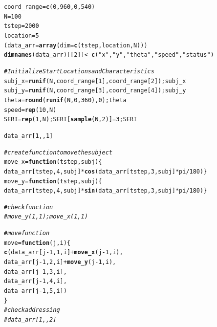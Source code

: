 \documentclass{article}\usepackage[]{graphicx}\usepackage[]{color}
\makeatletter
\newcommand{\hlnum}[1]{\textcolor[rgb]{0.686,0.059,0.569}{#1}}%
\newcommand{\hlstr}[1]{\textcolor[rgb]{0.192,0.494,0.8}{#1}}%
\newcommand{\hlcom}[1]{\textcolor[rgb]{0.678,0.584,0.686}{\textit{#1}}}%
\newcommand{\hlopt}[1]{\textcolor[rgb]{0,0,0}{#1}}%
\newcommand{\hlstd}[1]{\textcolor[rgb]{0.345,0.345,0.345}{#1}}%
\newcommand{\hlkwa}[1]{\textcolor[rgb]{0.161,0.373,0.58}{\textbf{#1}}}%
\newcommand{\hlkwb}[1]{\textcolor[rgb]{0.69,0.353,0.396}{#1}}%
\newcommand{\hlkwc}[1]{\textcolor[rgb]{0.333,0.667,0.333}{#1}}%
\newcommand{\hlkwd}[1]{\textcolor[rgb]{0.737,0.353,0.396}{\textbf{#1}}}%
\newenvironment{kframe}{%
 \def\at@end@of@kframe{}%
 \ifinner\ifhmode%
  \def\at@end@of@kframe{\end{minipage}}%
  \begin{minipage}{\columnwidth}%
 \fi\fi%
 \def\FrameCommand##1{\hskip\@totalleftmargin \hskip-\fboxsep
 \colorbox{shadecolor}{##1}\hskip-\fboxsep
     \hskip-\linewidth \hskip-\@totalleftmargin \hskip\columnwidth}%
 \MakeFramed {\advance\hsize-\width
   \@totalleftmargin\z@ \linewidth\hsize
   \@setminipage}}%
 {\par\unskip\endMakeFramed%
 \at@end@of@kframe}
\newenvironment{knitrout}{}{} %
\makeatother
\begin{document}
\begin{knitrout}
\color{fgcolor}\begin{kframe}
\begin{alltt}
\hlstd{coord_range} \hlkwb{=} \hlkwd{c}\hlstd{(}\hlnum{0}\hlstd{,} \hlnum{960}\hlstd{,} \hlnum{0}\hlstd{,} \hlnum{540}\hlstd{)}
\hlstd{N} \hlkwb{=} \hlnum{100}
\hlstd{tstep} \hlkwb{=} \hlnum{2000}
\hlstd{location} \hlkwb{=} \hlnum{5}
\hlstd{(data_arr} \hlkwb{=} \hlkwd{array}\hlstd{(}\hlkwc{dim}\hlstd{=}\hlkwd{c}\hlstd{(tstep,location, N)))}
\hlkwd{dimnames}\hlstd{(data_arr)[[}\hlnum{2}\hlstd{]]} \hlkwb{<-} \hlkwd{c}\hlstd{(}\hlstr{"x"}\hlstd{,} \hlstr{"y"}\hlstd{,} \hlstr{"theta"}\hlstd{,} \hlstr{"speed"}\hlstd{,} \hlstr{"status"}\hlstd{)}

\hlcom{# Initialize Start Locations and Characteristics}
\hlstd{subj_x} \hlkwb{=} \hlkwd{runif}\hlstd{(N, coord_range[}\hlnum{1}\hlstd{],  coord_range[}\hlnum{2}\hlstd{]); subj_x}
\hlstd{subj_y} \hlkwb{=} \hlkwd{runif}\hlstd{(N, coord_range[}\hlnum{3}\hlstd{],  coord_range[}\hlnum{4}\hlstd{]); subj_y}
\hlstd{theta} \hlkwb{=} \hlkwd{round}\hlstd{(}\hlkwd{runif}\hlstd{(N,} \hlnum{0}\hlstd{,} \hlnum{360}\hlstd{),}\hlnum{0}\hlstd{); theta}
\hlstd{speed} \hlkwb{=} \hlkwd{rep}\hlstd{(}\hlnum{10}\hlstd{,N)}
\hlstd{SERI} \hlkwb{=} \hlkwd{rep}\hlstd{(}\hlnum{1}\hlstd{, N); SERI[}\hlkwd{sample}\hlstd{(N,} \hlnum{2}\hlstd{)]} \hlkwb{=} \hlnum{3}\hlstd{; SERI}

\hlstd{data_arr[}\hlnum{1}\hlstd{,,}\hlnum{1}\hlstd{]}

\hlcom{#create function to move the subject}
\hlstd{move_x} \hlkwb{=} \hlkwa{function}\hlstd{(}\hlkwc{tstep}\hlstd{,} \hlkwc{subj}\hlstd{)\{}
\hlstd{data_arr[tstep,} \hlnum{4}\hlstd{, subj]} \hlopt{*} \hlkwd{cos}\hlstd{(data_arr[tstep,}\hlnum{3}\hlstd{, subj]}\hlopt{*}\hlstd{pi}\hlopt{/}\hlnum{180}\hlstd{)\}}
\hlstd{move_y} \hlkwb{=} \hlkwa{function}\hlstd{(}\hlkwc{tstep}\hlstd{,} \hlkwc{subj}\hlstd{)\{}
\hlstd{data_arr[tstep,} \hlnum{4}\hlstd{, subj]} \hlopt{*} \hlkwd{sin}\hlstd{(data_arr[tstep,}\hlnum{3}\hlstd{, subj]}\hlopt{*}\hlstd{pi}\hlopt{/}\hlnum{180}\hlstd{)\}}

\hlcom{# check function }
\hlcom{# move_y(1, 1); move_x(1,1)}

\hlcom{# move function}
\hlstd{move} \hlkwb{=} \hlkwa{function}\hlstd{(}\hlkwc{j}\hlstd{,} \hlkwc{i}\hlstd{)\{}
  \hlkwd{c}\hlstd{(data_arr[j}\hlopt{-}\hlnum{1}\hlstd{,} \hlnum{1}\hlstd{, i]}\hlopt{+} \hlkwd{move_x}\hlstd{(j}\hlopt{-}\hlnum{1}\hlstd{,i),}
    \hlstd{data_arr[j}\hlopt{-}\hlnum{1}\hlstd{,} \hlnum{2}\hlstd{, i]}\hlopt{+} \hlkwd{move_y}\hlstd{(j}\hlopt{-}\hlnum{1}\hlstd{,i),}
    \hlstd{data_arr[j}\hlopt{-}\hlnum{1}\hlstd{,} \hlnum{3}\hlstd{, i],}
    \hlstd{data_arr[j}\hlopt{-}\hlnum{1}\hlstd{,} \hlnum{4}\hlstd{, i],}
    \hlstd{data_arr[j}\hlopt{-}\hlnum{1}\hlstd{,} \hlnum{5}\hlstd{, i])}
\hlstd{\}}
\hlcom{# check addressing}
\hlcom{# data_arr[1,, 2]}


\end{alltt}
\end{kframe}
\end{knitrout}
\end{document}
